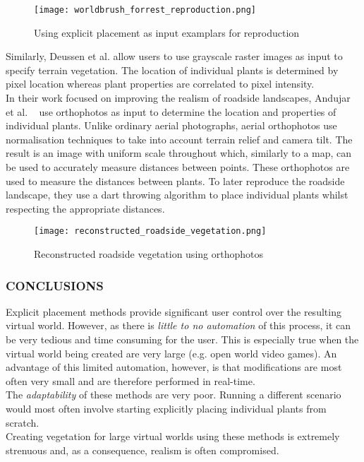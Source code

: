\begin{figure}[h]
  \centering
	\label{Explicit placement as input examplars}
	\texttt{[image: worldbrush\_forrest\_reproduction.png]}
	\caption{Using explicit placement as input examplars for reproduction \cite{Emilien}}
\end{figure}

Similarly, Deussen et al. \cite{Deussen1998} allow users to use grayscale raster images as input to specify terrain vegetation. The location of individual plants is determined by pixel location whereas plant properties are correlated to pixel intensity.\\

In their work focused on improving the realism of roadside landscapes, Andujar et al. ~\cite{Andujar2014} use orthophotos as input to determine the location and properties of individual plants. Unlike ordinary aerial photographs, aerial orthophotos use normalisation techniques to take into account terrain relief and camera tilt. The result is an image with uniform scale throughout which, similarly to a map, can be used to accurately measure distances between points. These orthophotos are used to measure the distances between plants. To later reproduce the roadside landscape, they use a dart throwing algorithm to place individual plants whilst respecting the appropriate distances. \\

\begin{figure}[!htb]
  \centering
	\label{Reconstructed roadside vegetation using orthophotos}
	\texttt{[image: reconstructed\_roadside\_vegetation.png]}
	\caption{Reconstructed roadside vegetation using orthophotos ~\cite{Andujar2014}}
\end{figure}

\subsubsection{CONCLUSIONS}

Explicit placement methods provide significant user control over the resulting virtual world. However, as there is \textit{little to no automation} of this process, it can be very tedious and time consuming for the user. This is especially true when the virtual world being created are very large (e.g. open world video games). An advantage of this limited automation, however, is that modifications are most often very small and are therefore performed in real-time. \\
The \textit{adaptability} of these methods are very poor. Running a different scenario would most often involve starting explicitly placing individual plants from scratch.\\
Creating vegetation for large virtual worlds using these methods is extremely strenuous and, as a consequence, realism is often compromised.

